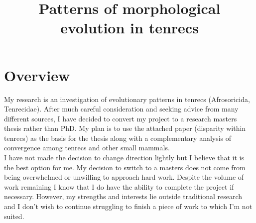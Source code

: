 \documentclass[12pt,a4paper]{article}
\begin{document}
\title{Patterns of morphological evolution in tenrecs}
\author{}
\date{}
\maketitle


\renewcommand{\headrulewidth}{0.0pt}
\thispagestyle{fancy}				%
\chead{}


\section{Overview}%



	

	My research is an investigation of evolutionary patterns in tenrecs (Afrosoricida,  Tenrecidae). After much careful consideration and seeking advice from many different sources, I have decided to convert my project to a research masters thesis rather than PhD. My plan is to use the attached paper (disparity within tenrecs) as the basis for the thesis along with a complementary analysis of convergence among tenrecs and other small mammals.\\ 
	
	I have not made the decision to change direction lightly but I believe that it is the best option for me. My decision to switch to a masters does not come from being overwhelmed or unwilling to approach hard work. Despite the volume of work remaining I know that I do have the ability to complete the project if necessary. However, my strengths and interests lie outside traditional research and I don't wish to continue struggling to finish a piece of work to which I'm not suited.
	
\end{document}
